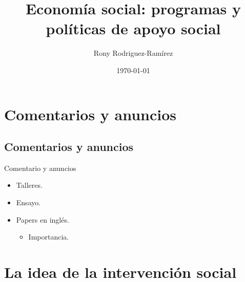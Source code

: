 \documentclass[11pt, aspectratio=169, compress]{beamer}
\title{Economía social: programas y políticas de apoyo social}
\author{Rony Rodriguez-Ramírez}
\institute{Economía Social y Humana | Grupo B018 \\Universidad Centroamericana}
\date{\today}
\begin{document}
	
\begin{frame}[plain]
	\maketitle  
\end{frame}

\section{Comentarios y anuncios}
\subsection{Comentarios y anuncios}
\begin{frame}[t]{Comentario y anuncios}
\begin{itemize}
	\item Talleres. 
	\item Ensayo. 
	\item Papers en inglés. 
	\begin{itemize}
		\item Importancia. 
	\end{itemize}
\end{itemize}
\end{frame}
\section{La idea de la intervención social}
\end{document}
